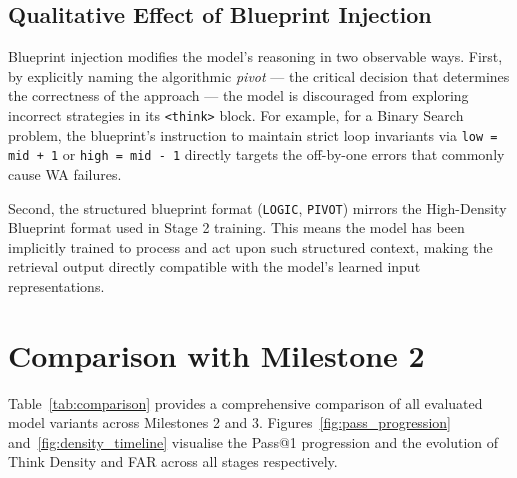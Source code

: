 \documentclass[12pt,a4paper]{article}
\begin{document}
\subsection{Qualitative Effect of Blueprint Injection}

Blueprint injection modifies the model's reasoning in two observable ways. First, by explicitly naming the algorithmic \textit{pivot} --- the critical decision that determines the correctness of the approach --- the model is discouraged from exploring incorrect strategies in its \texttt{<think>} block. For example, for a Binary Search problem, the blueprint's instruction to maintain strict loop invariants via \texttt{low = mid + 1} or \texttt{high = mid - 1} directly targets the off-by-one errors that commonly cause WA failures.

Second, the structured blueprint format (\texttt{LOGIC}, \texttt{PIVOT}) mirrors the High-Density Blueprint format used in Stage 2 training. This means the model has been implicitly trained to process and act upon such structured context, making the retrieval output directly compatible with the model's learned input representations.

\section{Comparison with Milestone 2}
\label{sec:comparison}

Table~\ref{tab:comparison} provides a comprehensive comparison of all evaluated model variants across Milestones 2 and 3. Figures~\ref{fig:pass_progression} and~\ref{fig:density_timeline} visualise the Pass@1 progression and the evolution of Think Density and FAR across all stages respectively.
\end{document}
